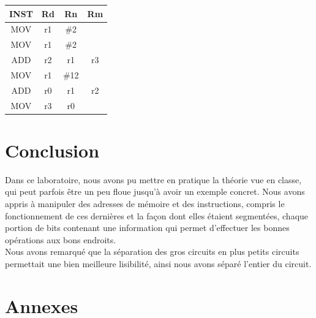 \documentclass[a4paper]{article} %
\begin{document}
\begin{tabular}{|c|c|c|c|}
    
    \hline
    INST & Rd & Rn  & Rm  \\
    \hline
    MOV  & r1 & \#2  &    \\
    \hline
    MOV  & r1 & \#2  &    \\
    \hline
    ADD  & r2 & r1   & r3 \\
    \hline
    MOV  & r1 & \#12 &    \\
    \hline
    ADD  & r0 & r1   & r2 \\
    \hline
    MOV  & r3 & r0   &    \\
    \hline
\end{tabular}
    

\section{Conclusion}
Dans ce laboratoire, nous avons pu mettre en pratique la théorie vue en classe, qui peut parfois être un peu floue jusqu'à avoir un exemple concret. Nous avons appris à manipuler des adresses de mémoire et des instructions, compris le fonctionnement de ces dernières et la façon dont elles étaient segmentées, chaque portion de bits contenant une information qui permet d'effectuer les bonnes opérations aux bons endroits. \\
Nous avons remarqué que la séparation des gros circuits en plus petits circuits permettait une bien meilleure lisibilité, ainsi nous avons séparé l'entier du circuit.
\section{Annexes}
\end{document}

